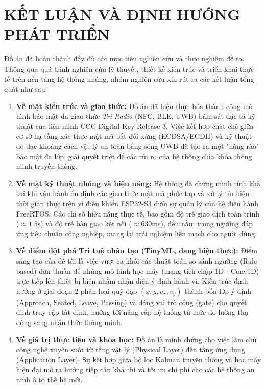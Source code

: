 \newpage
\chapter{\MakeUppercase{KẾT LUẬN VÀ ĐỊNH HƯỚNG PHÁT TRIỂN}}

Đồ án đã hoàn thành đầy đủ các mục tiêu nghiên cứu và thực nghiệm đề ra. Thông qua quá trình nghiên cứu lý thuyết, thiết kế kiến trúc và triển khai thực tế trên nền tảng hệ thống nhúng, nhóm nghiên cứu xin rút ra các kết luận tổng quát như sau:

\begin{enumerate}
    \item \textbf{Về mặt kiến trúc và giao thức:} Đồ án đã hiện thực hóa thành công mô hình bảo mật đa giao thức \textit{Tri-Radio} (NFC, BLE, UWB) bám sát đặc tả kỹ thuật của liên minh CCC Digital Key Release 3. Việc kết hợp chặt chẽ giữa cơ sở hạ tầng xác thực mật mã bất đối xứng (ECDSA/ECDH) và kỹ thuật đo đạc khoảng cách vật lý an toàn bằng sóng UWB đã tạo ra một "hàng rào" bảo mật đa lớp, giải quyết triệt để các rủi ro của hệ thống chìa khóa thông minh truyền thống.

    \item \textbf{Về mặt kỹ thuật nhúng và hiệu năng:} Hệ thống đã chứng minh tính khả thi khi vận hành ổn định các giao thức mật mã phức tạp và xử lý tín hiệu thời gian thực trên vi điều khiển ESP32-S3 dưới sự quản lý của hệ điều hành FreeRTOS. Các chỉ số hiệu năng thực tế, bao gồm độ trễ giao dịch toàn trình ($\approx 1.5$s) và độ trễ bàn giao kết nối ($\approx 630$ms), đều nằm trong ngưỡng đáp ứng tiêu chuẩn công nghiệp, mang lại trải nghiệm liền mạch cho người dùng.

    \item \textbf{Về điểm đột phá Trí tuệ nhân tạo (TinyML, đang hiện thực):} Điểm sáng tạo của đề tài là việc vượt ra khỏi các thuật toán so sánh ngưỡng (Rule-based) đơn thuần để nhúng mô hình học máy (mạng tích chập 1D - Conv1D) trực tiếp lên thiết bị biên nhằm nhận diện ý định hành vi. Kiến trúc định hướng ở giai đoạn 2 phân loại quỹ đạo $(x, y, v_x, v_y)$ thành bốn lớp ý định (Approach, Seated, Leave, Passing) và đóng vai trò cổng (gate) cho quyết định truy cập tất định, hướng tới nâng cấp hệ thống từ mức đo lường thụ động sang nhận thức thông minh.

    \item \textbf{Về giá trị thực tiễn và khoa học:} Đồ án là minh chứng cho việc làm chủ công nghệ xuyên suốt từ tầng vật lý (Physical Layer) đến tầng ứng dụng (Application Layer). Sự kết hợp giữa bộ lọc Kalman truyền thống và học máy hiện đại mở ra hướng tiếp cận khả thi và tối ưu chi phí cho các hệ thống an ninh ô tô thế hệ mới.
\end{enumerate}

